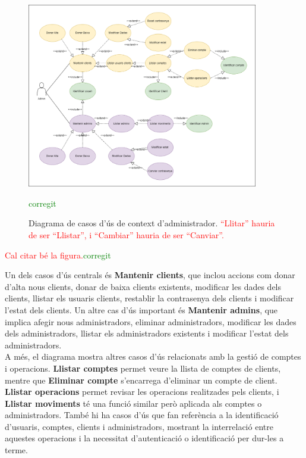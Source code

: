 \documentclass[a4paper,12pt,twoside]{ThesisStyle}
\newcommand{\pau}[1]{\textcolor{red}{#1}}
\newcommand{\sudan}[1]{\textcolor{green}{#1}}
\begin{document}
\clearpage
\begin{figure}[h]
    \centering
    \includegraphics[width=0.9\textwidth]{imatges/diagrama caso de uso admin.png}
    \caption{Diagrama de casos d'ús de context d'administrador. \pau{``Llitar'' hauria de ser ``Llistar'', i ``Cambiar'' hauria de ser ``Canviar''.}}\sudan{corregit}
    \label{fig:Diagrama de Casos d'Ús de Context d'Administrador}
\end{figure}

\pau{Cal citar bé la figura.}\sudan{corregit}


 Un dels casos d'ús centrals és \textbf{Mantenir clients}, que inclou accions com donar d'alta nous clients, donar de baixa clients existents, modificar les dades dels clients, llistar els usuaris clients, restablir la contrasenya dels clients i modificar l'estat dels clients. Un altre cas d'ús important és \textbf{Mantenir admins}, que implica afegir nous administradors, eliminar administradors, modificar les dades dels administradors, llistar els administradors existents i modificar l'estat dels administradors.\\

A més, el diagrama mostra altres casos d'ús relacionats amb la gestió de comptes i operacions. \textbf{Llistar comptes} permet veure la llista de comptes de clients, mentre que \textbf{Eliminar compte} s'encarrega d'eliminar un compte de client. \textbf{Llistar operacions} permet revisar les operacions realitzades pels clients, i \textbf{Llistar moviments} té una funció similar però aplicada als comptes o administradors. També hi ha casos d'ús que fan referència a la identificació d'usuaris, comptes, clients i administradors, mostrant la interrelació entre aquestes operacions i la necessitat d'autenticació o identificació per dur-les a terme.
\end{document}
